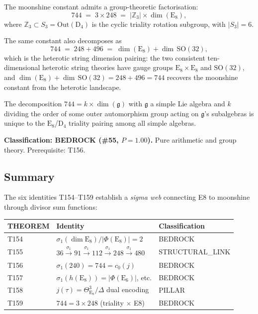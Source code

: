 \documentclass[aps,prd,twocolumn,superscriptaddress,floatfix,nofootinbib]{revtex4-2}
\theoremstyle{definition}
\theoremstyle{remark}
\begin{document}
The moonshine constant admits a group-theoretic factorisation:
\begin{equation}
  744 \;=\; 3 \times 248 \;=\; |\mathbb{Z}_3| \times \dim(\mathrm{E}_8),
  \label{eq:triality-decomp}
\end{equation}
where $\mathbb{Z}_3 \subset S_3 = \mathrm{Out}(\mathrm{D}_4)$ is the
cyclic triality rotation subgroup, with $|S_3| = 6$.

The same constant also decomposes as
\begin{equation}
  744 \;=\; 248 + 496 \;=\;
    \dim(\mathrm{E}_8) + \dim\,\mathrm{SO}(32),
  \label{eq:heterotic-decomp}
\end{equation}
which is the heterotic string dimension pairing: the two consistent
ten-dimensional heterotic string theories have gauge groups
$\mathrm{E}_8 \times \mathrm{E}_8$ and $\mathrm{SO}(32)$, and
$\dim(\mathrm{E}_8) + \dim\,\mathrm{SO}(32) = 248 + 496 = 744$
recovers the moonshine constant from the heterotic landscape.

The decomposition $744 = k \times \dim(\mathfrak{g})$ with
$\mathfrak{g}$ a simple Lie algebra and $k$ dividing the order of
some outer automorphism group acting on $\mathfrak{g}$'s subalgebras
is unique to the $\mathrm{E}_8$/$\mathrm{D}_4$ triality pairing
among all simple algebras.

\textbf{Classification: BEDROCK (\#55, $P{=}1.00$).}  Pure arithmetic
and group theory.  Prerequisite: T156.

\subsection{Summary}

The six identities T154--T159 establish a \emph{sigma web} connecting
E8 to moonshine through divisor sum functions:

\begin{center}
\begin{tabular}{lll}
\toprule
THEOREM & Identity & Classification \\
\midrule
T154 & $\sigma_1(\dim\mathrm{E}_8)/|\Phi(\mathrm{E}_8)| = 2$
     & BEDROCK \\
T155 & $36 \xrightarrow{\sigma_1} 91 \xrightarrow{\sigma_1} 112
       \xrightarrow{\sigma_1} 248 \xrightarrow{\sigma_1} 480$
     & STRUCTURAL\_LINK \\
T156 & $\sigma_1(240) = 744 = c_0(j)$
     & BEDROCK \\
T157 & $\sigma_1(h(\mathrm{E}_8)) = |\Phi(\mathrm{E}_6)|$, etc.
     & BEDROCK \\
T158 & $j(\tau) = \Theta_{\mathrm{E}_8}^3/\Delta$ dual encoding
     & PILLAR \\
T159 & $744 = 3 \times 248$ (triality $\times$ E8)
     & BEDROCK \\
\bottomrule
\end{tabular}
\end{center}
\end{document}

